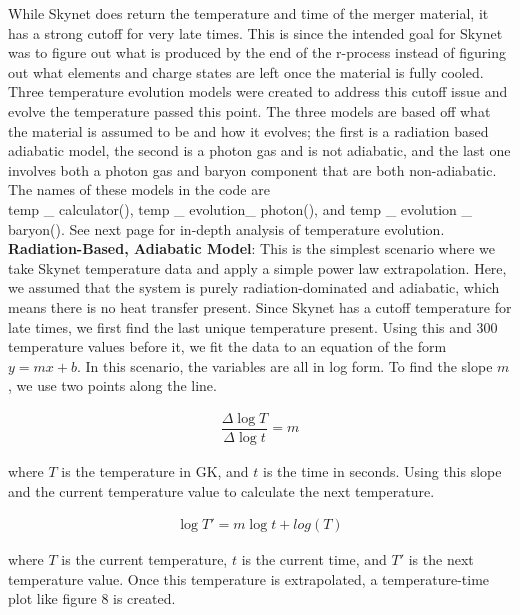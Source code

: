 \documentclass[11pt,a4paper]{article}
\begin{document}
While Skynet does return the temperature and time of the merger material, it has a strong cutoff for very late times. This is since the intended goal for Skynet was to figure out what is produced by the end of the r-process instead of figuring out what elements and charge states are left once the material is fully cooled. Three temperature evolution models were created to address this cutoff issue and evolve the temperature passed this point. The three models are based off what the material is assumed to be and how it evolves; the first is a radiation based adiabatic model, the second is a photon gas and is not adiabatic, and the last one involves both a photon gas and baryon component that are both non-adiabatic. The names of these models in the code are \\ temp \_ calculator(),  temp \_ evolution\_ photon(), and temp \_ evolution \_ baryon(). See next page for in-depth analysis of temperature evolution. \\ 


\textbf{Radiation-Based, Adiabatic Model}: This is the simplest scenario where we take Skynet temperature data and apply a simple power law extrapolation. Here, we assumed that the system is purely radiation-dominated and adiabatic, which means there is no heat transfer present. Since Skynet has a cutoff temperature for late times, we first find the last unique temperature present. Using this and 300 temperature values before it, we fit the data to an equation of the form $y = mx + b$. In this scenario, the variables are all in log form. To find the slope $m$, we use two points along the line.

\begin{align}
	\dfrac{\Delta \log{T}}{\Delta \log{t}} = m 
\end{align}

where $T$ is the temperature in GK, and $t$ is the time in seconds. Using this slope and the current temperature value to calculate the next temperature. 

\begin{align}
	\log{T'} = m \log{t} + log(T)
\end{align}

where $T$ is the current temperature, $t$ is the current time, and $T'$ is the next temperature value. Once this temperature is extrapolated, a temperature-time plot like figure 8 is created.  \\\\
\end{document}
